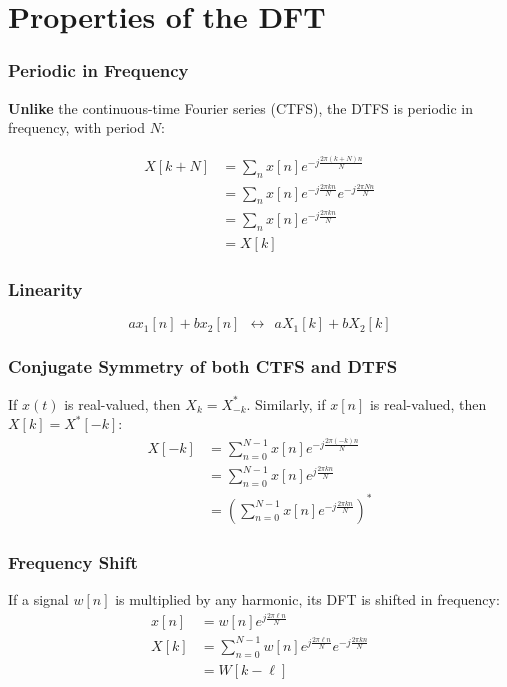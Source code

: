\documentclass{beamer}
\begin{document}
\section[Properties of DFT]{Properties of the DFT}
\setcounter{subsection}{1}


\begin{frame}
  \frametitle{Periodic in Frequency}

  \textbf{Unlike} the continuous-time Fourier series (CTFS), the DTFS is
  periodic in frequency, with period $N$:

  \begin{align*}
    X[k+N] &= \sum_n x[n]e^{-j\frac{2\pi (k+N)n}{N}}\\
    &= \sum_n x[n]e^{-j\frac{2\pi kn}{N}}e^{-j\frac{2\pi Nn}{N}}\\    
    &= \sum_n x[n]e^{-j\frac{2\pi kn}{N}}\\
    &= X[k]
  \end{align*}
\end{frame}  
        
\begin{frame}
  \frametitle{Linearity}

  \begin{displaymath}
    ax_1[n]+bx_2[n] ~~\leftrightarrow~~aX_1[k]+bX_2[k]
  \end{displaymath}
\end{frame}  

\begin{frame}
  \frametitle{Conjugate Symmetry of both CTFS and DTFS}

  If $x(t)$ is real-valued, then $X_k=X^*_{-k}$.  Similarly, if
  $x[n]$ is real-valued, then $X[k]=X^*[-k]$:
  \begin{align*}
    X[-k]
    &= \sum_{n=0}^{N-1} x[n]e^{-j\frac{2\pi (-k)n}{N}}\\
    &= \sum_{n=0}^{N-1} x[n]e^{j\frac{2\pi kn}{N}}\\
    &= \left(\sum_{n=0}^{N-1} x[n]e^{-j\frac{2\pi kn}{N}}\right)^*
  \end{align*}
  
\end{frame}  

\begin{frame}
  \frametitle{Frequency Shift}

  If a signal $w[n]$ is multiplied by any harmonic, its DFT is shifted
  in frequency:
  \begin{align*}
    x[n]&=w[n]e^{j\frac{2\pi\ell n}{N}}\\
    X[k]&= \sum_{n=0}^{N-1} w[n]e^{j\frac{2\pi\ell n}{N}}e^{-j\frac{2\pi kn}{N}}\\
    &= W[k-\ell]
  \end{align*}
\end{frame}
\end{document}

